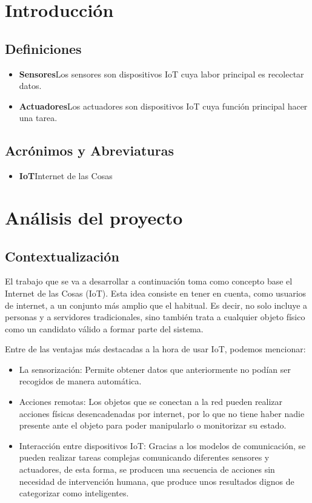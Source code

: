 \documentclass[12pt, a4paper, twoside]{article}
\newcommand\ttab{\tab \hspace{-5cm}}
\begin{document}


\newpage

\tableofcontents

\section{Introducción}
\subsection{Definiciones}
\begin{itemize}
    \item \textbf{Sensores}\ttab Los sensores son dispositivos IoT cuya labor principal es recolectar datos.
    \item \textbf{Actuadores}\ttab Los actuadores son dispositivos IoT cuya función principal hacer una tarea.
  \end{itemize}
\subsection{Acrónimos y Abreviaturas}
\begin{itemize}
    \item \textbf{IoT}\ttab Internet de las Cosas
  \end{itemize}

\section{Análisis del proyecto}
\subsection{Contextualización}
El trabajo que se va a desarrollar a continuación toma como concepto base el Internet de las Cosas (IoT).
Esta idea consiste en tener en cuenta, como usuarios de internet, a un conjunto más amplio que el 
habitual. Es decir, no solo incluye a personas y a servidores tradicionales, sino también trata a cualquier objeto 
físico como un candidato válido a formar parte del sistema.

Entre de las ventajas más destacadas a la hora de usar IoT, podemos mencionar:
\begin{itemize}
    \item La sensorización: Permite obtener datos que anteriormente no podían ser recogidos de manera automática.
    \item Acciones remotas: Los objetos que se conectan a la red pueden realizar acciones físicas desencadenadas por internet,
      por lo que no tiene haber nadie presente ante el objeto para poder manipularlo o monitorizar su estado.
    \item Interacción entre dispositivos IoT: Gracias a los modelos de comunicación, se pueden realizar tareas complejas
      comunicando diferentes sensores y actuadores, de esta forma, se producen una secuencia de acciones sin necesidad
      de intervención humana, que produce unos resultados dignos de categorizar como inteligentes.
\end{itemize}
\end{document}
